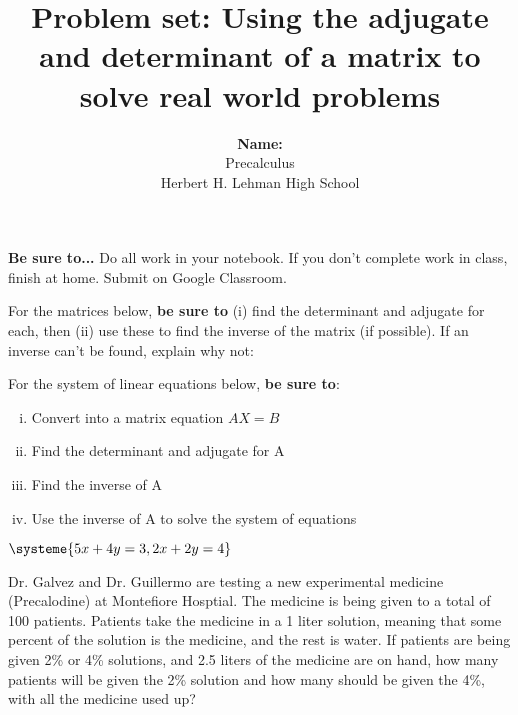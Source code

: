 \documentclass{exam}
\title{Problem set: Using the adjugate and determinant of a matrix to solve real world problems  }
\author{ \textbf{Name: }  \enspace\hrulefill \\ Precalculus \\ Herbert H. Lehman High School }
\begin{document}
\maketitle
\thispagestyle{empty}

\noindent\textbf{Be sure to...} Do all work in your notebook.  If you don't complete work in class, finish at home. Submit on Google Classroom.
\begin{questions}
\question 
For the matrices below, \textbf{be sure to} (i) find the determinant and adjugate for each, then (ii) use these to find the inverse of the matrix (if possible). If an inverse can't be found, explain why not:


\question
For the system of linear equations below, \textbf{be sure to}:
\begin{multicols}{2}
\begin{enumerate}[i.]
\item Convert into a matrix equation $AX=B$
\item Find the determinant and adjugate for A 
\item Find the inverse of A
\item Use the inverse of A to solve the system of equations
\end{enumerate}
\columnbreak

$
\systeme{
5x + 4y =  3,
2x + 2y = 4
}
$
\end{multicols}

\question
Dr. Galvez and Dr. Guillermo are testing a new  experimental medicine (Precalodine) at Montefiore Hosptial.  The medicine is being given to a total of 100 patients.  Patients take the medicine in a 1 liter solution, meaning that some percent of the solution is the medicine, and the rest is water.  If patients are being given 2\% or 4\% solutions, and 2.5 liters of the medicine are on hand, how many patients will be given the 2\% solution and how many should be given the 4\%, with all the medicine used up?


\end{questions}
\end{document}
